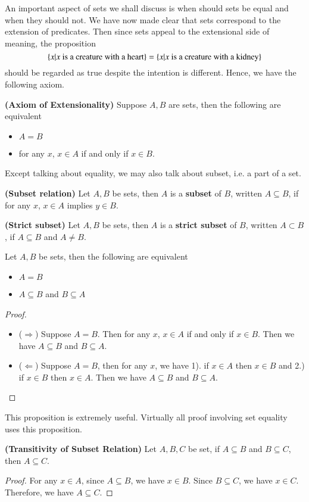 An important aspect of sets we shall discuss is when should sets be equal and when they should not. We have now made clear that sets correspond to the extension of predicates. Then since sets appeal to the extensional side of meaning, the proposition 
\begin{equation*}
    \{x|x\text{ is a creature with a heart}\} = \{x|x\text{ is a creature with a kidney}\}
\end{equation*}
should be regarded as true despite the intention is different. Hence, we have the following axiom.
\begin{ax}
    \textbf{(Axiom of Extensionality)} Suppose $A,B$ are sets, then the following are equivalent
    \begin{itemize}
        \item $A = B$
        \item for any $x$, $x\in A$ if and only if $x\in B$.
    \end{itemize}
Except talking about equality, we may also talk about subset, i.e. a part of a set.
\end{ax}
\begin{defn}
    \textbf{(Subset relation)} Let $A,B$ be sets, then $A$ is a \textbf{subset} of $B$, written $A\subseteq B$, if for any $x$, $x\in A$ implies $y\in B$.
\end{defn}
\begin{defn}
    \textbf{(Strict subset)} Let $A,B$ be sets, then $A$ is a \textbf{strict subset} of $B$, written $A\subset B$, if $A\subseteq B$ and $A\neq B$.
\end{defn}
\begin{prop}
    Let $A,B$ be sets, then the following are equivalent
    \begin{itemize}
        \item $A=B$
        \item $A\subseteq B$ and $B\subseteq A$
    \end{itemize}
\end{prop}
\begin{proof}
    ~ 
    \begin{itemize}
        \item ($\Rightarrow$) Suppose $A=B$. Then for any $x$, $x\in A$ if and only if $x\in B$. Then we have $A\subseteq B$ and $B\subseteq A$.
        \item ($\Leftarrow$) Suppose $A= B$, then for any $x$, we have 1). if $x\in A$ then $x\in B$ and 2.) if $x\in B$ then $x\in A$. Then we have $A\subseteq B$ and $B\subseteq A$.
    \end{itemize}
\end{proof}
\begin{rem}
    This proposition is extremely useful. Virtually all proof involving set equality uses this proposition.
\end{rem}
\begin{prop}
    \textbf{(Transitivity of Subset Relation)} Let $A,B,C$ be set, if $A\subseteq B$ and $B\subseteq C$, then $A\subseteq C$.
\end{prop}
\begin{proof}
    For any $x\in A$, since $A\subseteq B$, we have $x\in B$. Since $B\subseteq C$, we have $x\in C$. Therefore, we have $A\subseteq C$.
\end{proof}

